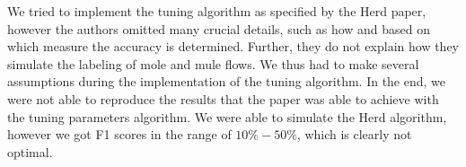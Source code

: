 \documentclass[11pt,oneside,a4paper]{article}
\begin{document}
We tried to implement the tuning algorithm as specified by the Herd paper, however the authors omitted many crucial details, such as how and based on which measure the accuracy is determined. Further, they do not explain how they simulate the labeling of mole and mule flows. We thus had to make several assumptions during the implementation of the tuning algorithm. In the end, we were not able to reproduce the results that the paper was able to achieve with the tuning parameters algorithm. We were able to simulate the Herd algorithm, however we got F1 scores in the range of $10\% - 50\%$, which is clearly not optimal.



\end{document}

